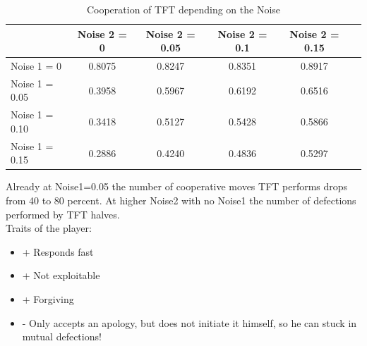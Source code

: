 \begin{table}[h]
 \begin{center}
\caption{Cooperation of TFT depending on the Noise} \vspace{3mm}
\begin{tabular}{|l|c|c|c|c|c|}
\hline
   	& Noise 2 = 0 & Noise 2 = 0.05& Noise 2 = 0.1& Noise 2 = 0.15 \\
  \hline
  Noise 1 = 0 	& 0.8075	 &0.8247 	&0.8351	&0.8917 \\
 \hline
  Noise 1 = 0.05	 & 0.3958	&    0.5967&    0.6192 &   0.6516 \\
 \hline
  Noise 1 = 0.10 	& 0.3418 &   0.5127 &   0.5428&   0.5866 \\
 \hline
  Noise 1 = 0.15 	& 0.2886  &  0.4240 &   0.4836  &  0.5297 \\
 \hline
\end{tabular}
 \end{center}
\end{table}

Already at Noise1=0.05 the number of cooperative moves TFT performs drops from 40 to 80 percent. At higher Noise2 with no Noise1 the number of defections performed by TFT halves.\\

Traits of the player:

\renewcommand{\labelitemi}{}

\begin{itemize}
	\item + Responds fast
	\item + Not exploitable
	\item + Forgiving
	\item - Only accepts an apology, but does not initiate it himself, so he can stuck in mutual defections!
\end{itemize}
\renewcommand{\labelitemi}{$\bullet$}

